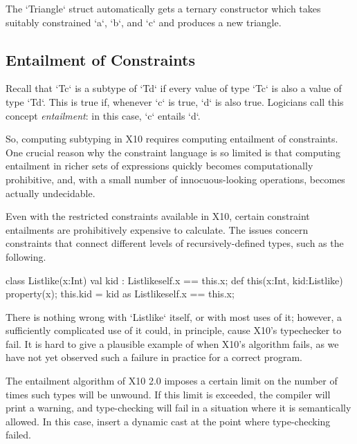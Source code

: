 The \xcd`Triangle` struct automatically gets a ternary constructor which takes
suitably constrained \xcd`a`, \xcd`b`, and \xcd`c` and produces a new
triangle. 


\subsection{Entailment of Constraints}

Recall that \xcd`T{c}` is a subtype of \xcd`T{d}` if every value of type
\xcd`T{c}` is also a value of type \xcd`T{d}`.  This is true if, whenever
\xcd`c` is true, \xcd`d` is also true.  Logicians call this concept {\em
entailment}: in this case, \xcd`c` entails \xcd`d`.  

So, computing subtyping in X10 requires computing entailment of constraints.
One crucial reason why the constraint language is so limited is that computing
entailment in richer sets of expressions quickly becomes computationally
prohibitive, and, with a small number of innocuous-looking operations, becomes
actually undecidable.  



Even with the restricted constraints available in X10, certain
constraint entailments are prohibitively expensive to calculate.  The issues
concern constraints that connect different levels of recursively-defined
types, such as the following.  
\begin{xten}
class Listlike(x:Int) {
  val kid : Listlike{self.x == this.x};
  def this(x:Int, kid:Listlike) { 
     property(x); 
     this.kid = kid as Listlike{self.x == this.x};}
}
\end{xten}
%
There is nothing wrong with \xcd`Listlike` itself, or with most uses of it;
however, a sufficiently complicated use of it could, in principle, cause X10's
typechecker to fail. 
It is hard to give a plausible example of when X10's algorithm fails, as we
have not yet observed such a failure in practice for a correct program.  

The entailment algorithm of X10 2.0 imposes a certain limit on the number of
times such types will be unwound.   If this limit is exceeded, the compiler
will print a warning, and type-checking will fail in a situation where it is
semantically allowed.  In this case, insert a dynamic cast at the point where
type-checking failed.  





